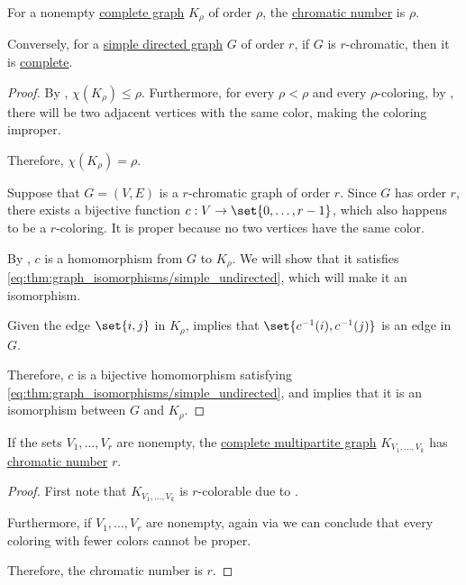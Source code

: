 \begin{proposition}\label{thm:complete_graph_chromatic_number}
  For a nonempty \hyperref[def:complete_graph]{complete graph} \( K_\rho \) of order \( \rho \), the \hyperref[def:graph_chromatic_number]{chromatic number} is \( \rho \).

  Conversely, for a \hyperref[def:directed_graph]{simple directed graph} \( G \) of  order \( r \), if \( G \) is \( r \)-chromatic, then it is \hyperref[def:complete_subgraph]{complete}.
\end{proposition}
\begin{proof}
  \SufficiencySubProof By , \( \chi(K_\rho) \leq \rho \). Furthermore, for every \( \rho < \rho \) and every \( \rho \)-coloring, by , there will be two adjacent vertices with the same color, making the coloring improper.

  Therefore, \( \chi(K_\rho) = \rho \).

  \NecessitySubProof Suppose that \( G = (V, E) \) is a \( r \)-chromatic graph of order \( r \). Since \( G \) has order \( r \), there exists a bijective function \( c: V \to \set{ 0, \ldots, r - 1 } \), which also happens to be a \( r \)-coloring. It is proper because no two vertices have the same color.

  By , \( c \) is a homomorphism from \( G \) to \( K_\rho \). We will show that it satisfies \eqref{eq:thm:graph_isomorphisms/simple_undirected}, which will make it an isomorphism.

  Given the edge \( \set{ i, j } \) in \( K_\rho \),  implies that \( \set{ c^{-1}(i), c^{-1}(j) } \) is an edge in \( G \).

  Therefore, \( c \) is a bijective homomorphism satisfying \eqref{eq:thm:graph_isomorphisms/simple_undirected}, and  implies that it is an isomorphism between \( G \) and \( K_\rho \).
\end{proof}

\begin{proposition}\label{thm:complete_multipartite_graph_chromatic_number}
  If the sets \( V_1, \ldots, V_r \) are nonempty, the \hyperref[def:complete_multipartite_graph]{complete multipartite graph} \( K_{V_1,\ldots,V_k} \) has \hyperref[def:graph_chromatic_number]{chromatic number} \( r \).
\end{proposition}
\begin{proof}
  First note that \( K_{V_1, \ldots, V_k} \) is \( r \)-colorable due to .

  Furthermore, if \( V_1, \ldots, V_r \) are nonempty, again via  we can conclude that every coloring with fewer colors cannot be proper.

  Therefore, the chromatic number is \( r \).
\end{proof}

